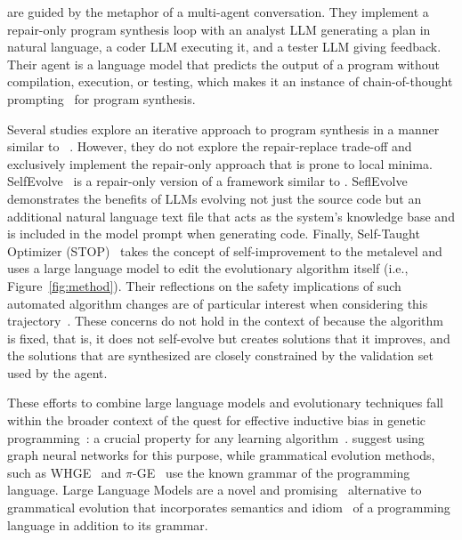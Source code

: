 \citet{dong2024:selfcollaboration} are guided by the metaphor of a multi-agent conversation. 
They implement a repair-only program synthesis loop with an analyst LLM generating a plan in natural language, a coder LLM executing it, and a tester LLM giving feedback. 
Their \execute{} agent is a language model that predicts the output of a program without compilation, execution, or testing, which makes it an instance of chain-of-thought prompting~\cite{yu2023:better} for program synthesis.

Several studies explore an iterative approach to program synthesis in a manner similar to \method{}~\cite{xia2023:conversational,chen2023:teaching,shinn2023:reflexion}. 
However, they do not explore the repair-replace trade-off and exclusively implement the repair-only approach that is prone to local minima.
SelfEvolve~\cite{jiang2023:selfevolve} is a repair-only version of a framework similar to \method{}.
SeflEvolve demonstrates the benefits of LLMs evolving not just the source code but an additional natural language text file that acts as the system's knowledge base and is included in the model prompt when generating code.
Finally, Self-Taught Optimizer (STOP)~\cite{zelikman2023:selftaught} takes the concept of self-improvement to the metalevel and uses a large language model to edit the evolutionary algorithm itself (i.e., Figure~\ref{fig:method}). 
Their reflections on the safety implications of such automated algorithm changes are of particular interest when considering this trajectory~\cite[Section 8]{zelikman2023:selftaught}. These concerns do not hold in the context of \method{} because the algorithm is fixed, that is, it does not self-evolve but creates solutions that it improves, and the solutions that are synthesized are closely constrained by the validation set used by the \execute{} agent.

These efforts to combine large language models and evolutionary techniques fall within the broader context of the quest for effective inductive bias in genetic programming~\cite{whighamSearchBiasLanguage1996}: a crucial property for any learning algorithm~\cite{haussler1988:quantifying}. 
\citet{reuterGraphNetworksInductive2023} suggest using graph neural networks for this purpose, while grammatical evolution methods, such as WHGE~\cite{bartoliWeightedHierarchicalGrammatical2020} and $\pi$-GE~\cite{oneill2004:pgrammatical} use the known grammar of the programming language.
Large Language Models are a novel and promising~\cite{custodeComparingLargeLanguage2024} alternative to grammatical evolution that incorporates semantics and idiom~\cite{allamanisMiningIdiomsSource2014,orlovFindingIdiomsSource2020} of a programming language in addition to its grammar. 

